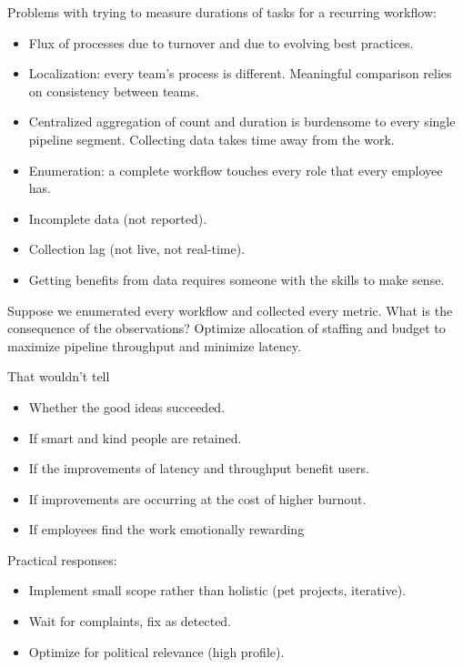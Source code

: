 Problems with trying to measure durations of tasks for a recurring workflow: 
\begin{itemize}
    \item Flux of processes due to turnover and due to evolving best practices.
    \item Localization: every team's process is different. Meaningful comparison relies on consistency between teams.
    \item Centralized aggregation of count and duration is burdensome to every single pipeline segment. Collecting data takes time away from the work.
    \item Enumeration: a complete workflow touches every role that every employee has.
    \item Incomplete data (not reported).
    \item Collection lag (not live, not real-time).
    \item Getting benefits from data requires someone with the skills to make sense.
\end{itemize}

Suppose we enumerated every workflow and collected every metric.
What is the consequence of the observations?
Optimize allocation of staffing and budget to maximize pipeline throughput and minimize latency.

That wouldn't tell 
\begin{itemize}
    \item Whether the good ideas succeeded.
    \item If smart and kind people are retained.
    \item If the improvements of latency and throughput benefit users.
    \item If improvements are occurring at the cost of higher burnout.
    \item If employees find the work emotionally rewarding 
\end{itemize}


Practical responses: 
\begin{itemize}
    \item Implement small scope rather than holistic (pet projects, iterative).
    \item Wait for complaints, fix as detected.
    \item Optimize for political relevance (high profile).
\end{itemize}
